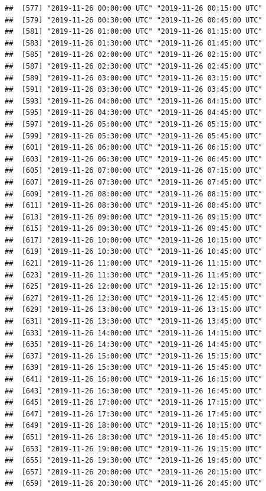 \documentclass{article}\usepackage[]{graphicx}\usepackage[]{color}
\makeatletter
\newenvironment{kframe}{%
 \def\at@end@of@kframe{}%
 \ifinner\ifhmode%
  \def\at@end@of@kframe{\end{minipage}}%
  \begin{minipage}{\columnwidth}%
 \fi\fi%
 \def\FrameCommand##1{\hskip\@totalleftmargin \hskip-\fboxsep
 \colorbox{shadecolor}{##1}\hskip-\fboxsep
     \hskip-\linewidth \hskip-\@totalleftmargin \hskip\columnwidth}%
 \MakeFramed {\advance\hsize-\width
   \@totalleftmargin\z@ \linewidth\hsize
   \@setminipage}}%
 {\par\unskip\endMakeFramed%
 \at@end@of@kframe}
\newenvironment{knitrout}{}{} %
\makeatother
\begin{document}
\begin{knitrout}
\begin{kframe}
\begin{verbatim}
##  [577] "2019-11-26 00:00:00 UTC" "2019-11-26 00:15:00 UTC"
##  [579] "2019-11-26 00:30:00 UTC" "2019-11-26 00:45:00 UTC"
##  [581] "2019-11-26 01:00:00 UTC" "2019-11-26 01:15:00 UTC"
##  [583] "2019-11-26 01:30:00 UTC" "2019-11-26 01:45:00 UTC"
##  [585] "2019-11-26 02:00:00 UTC" "2019-11-26 02:15:00 UTC"
##  [587] "2019-11-26 02:30:00 UTC" "2019-11-26 02:45:00 UTC"
##  [589] "2019-11-26 03:00:00 UTC" "2019-11-26 03:15:00 UTC"
##  [591] "2019-11-26 03:30:00 UTC" "2019-11-26 03:45:00 UTC"
##  [593] "2019-11-26 04:00:00 UTC" "2019-11-26 04:15:00 UTC"
##  [595] "2019-11-26 04:30:00 UTC" "2019-11-26 04:45:00 UTC"
##  [597] "2019-11-26 05:00:00 UTC" "2019-11-26 05:15:00 UTC"
##  [599] "2019-11-26 05:30:00 UTC" "2019-11-26 05:45:00 UTC"
##  [601] "2019-11-26 06:00:00 UTC" "2019-11-26 06:15:00 UTC"
##  [603] "2019-11-26 06:30:00 UTC" "2019-11-26 06:45:00 UTC"
##  [605] "2019-11-26 07:00:00 UTC" "2019-11-26 07:15:00 UTC"
##  [607] "2019-11-26 07:30:00 UTC" "2019-11-26 07:45:00 UTC"
##  [609] "2019-11-26 08:00:00 UTC" "2019-11-26 08:15:00 UTC"
##  [611] "2019-11-26 08:30:00 UTC" "2019-11-26 08:45:00 UTC"
##  [613] "2019-11-26 09:00:00 UTC" "2019-11-26 09:15:00 UTC"
##  [615] "2019-11-26 09:30:00 UTC" "2019-11-26 09:45:00 UTC"
##  [617] "2019-11-26 10:00:00 UTC" "2019-11-26 10:15:00 UTC"
##  [619] "2019-11-26 10:30:00 UTC" "2019-11-26 10:45:00 UTC"
##  [621] "2019-11-26 11:00:00 UTC" "2019-11-26 11:15:00 UTC"
##  [623] "2019-11-26 11:30:00 UTC" "2019-11-26 11:45:00 UTC"
##  [625] "2019-11-26 12:00:00 UTC" "2019-11-26 12:15:00 UTC"
##  [627] "2019-11-26 12:30:00 UTC" "2019-11-26 12:45:00 UTC"
##  [629] "2019-11-26 13:00:00 UTC" "2019-11-26 13:15:00 UTC"
##  [631] "2019-11-26 13:30:00 UTC" "2019-11-26 13:45:00 UTC"
##  [633] "2019-11-26 14:00:00 UTC" "2019-11-26 14:15:00 UTC"
##  [635] "2019-11-26 14:30:00 UTC" "2019-11-26 14:45:00 UTC"
##  [637] "2019-11-26 15:00:00 UTC" "2019-11-26 15:15:00 UTC"
##  [639] "2019-11-26 15:30:00 UTC" "2019-11-26 15:45:00 UTC"
##  [641] "2019-11-26 16:00:00 UTC" "2019-11-26 16:15:00 UTC"
##  [643] "2019-11-26 16:30:00 UTC" "2019-11-26 16:45:00 UTC"
##  [645] "2019-11-26 17:00:00 UTC" "2019-11-26 17:15:00 UTC"
##  [647] "2019-11-26 17:30:00 UTC" "2019-11-26 17:45:00 UTC"
##  [649] "2019-11-26 18:00:00 UTC" "2019-11-26 18:15:00 UTC"
##  [651] "2019-11-26 18:30:00 UTC" "2019-11-26 18:45:00 UTC"
##  [653] "2019-11-26 19:00:00 UTC" "2019-11-26 19:15:00 UTC"
##  [655] "2019-11-26 19:30:00 UTC" "2019-11-26 19:45:00 UTC"
##  [657] "2019-11-26 20:00:00 UTC" "2019-11-26 20:15:00 UTC"
##  [659] "2019-11-26 20:30:00 UTC" "2019-11-26 20:45:00 UTC"

\end{verbatim}
\end{kframe}
\end{knitrout}
\end{document}
